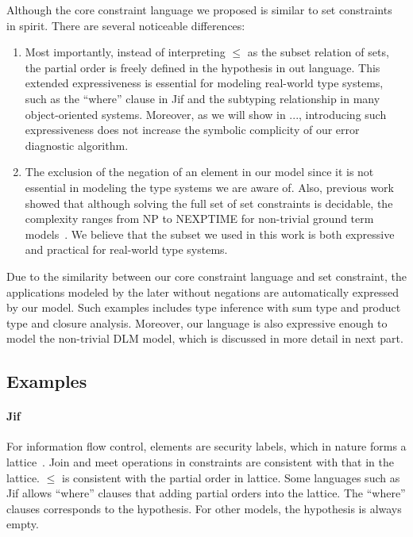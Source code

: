 Although the core constraint language we proposed is similar to set
constraints~\cite{aiken-setconstraint} in spirit. There are several
noticeable differences:

\begin{enumerate}

\item Most importantly, instead of interpreting $\leq$ as the subset
relation of sets, the partial order is freely defined in the
hypothesis in out language. This extended expressiveness is essential
for modeling real-world type systems, such as the ``where'' clause in
Jif and the subtyping relationship in many object-oriented systems.
Moreover, as we will show in ..., introducing such expressiveness does
not increase the symbolic complicity of our error diagnostic
algorithm.

\item The exclusion of the negation of an element in our model since
it is not essential in modeling the type systems we are aware of.
Also, previous work showed that although solving the full set of set
constraints is decidable, the complexity ranges from NP to NEXPTIME
for non-trivial ground term models~\cite{aiken-complexity}. We believe
that the subset we used in this work is both expressive and practical
for real-world type systems.

\end{enumerate}

Due to the similarity between our core constraint language and set
constraint, the applications modeled by the later without negations
are automatically expressed by our model. Such examples includes type
inference with sum type and product type and closure analysis.
Moreover, our language is also expressive enough to model the
non-trivial DLM model, which is discussed in more detail in next part.

\subsection{Examples}

\paragraph{Jif}

For information flow control, elements are security labels, which in
nature forms a lattice~\cite{denning-lattice}. Join and meet
operations in constraints are consistent with that in the lattice.
$\leq$ is consistent with the partial order in lattice. Some languages
such as Jif allows ``where'' clauses that adding partial orders into
the lattice. The ``where'' clauses corresponds to the hypothesis.  For
other models, the hypothesis is always empty.

